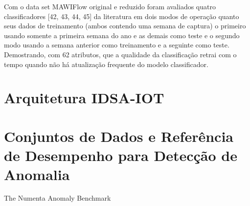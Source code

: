 Com o data set MAWIFlow original e reduzido foram avaliados quatro classificadores [42, 43, 44, 45]
da literatura em dois modos de operação quanto seus dados de treinamento
(ambos contendo uma semana de captura) o primeiro usando somente a primeira semana do ano e as demais
como teste e o segundo modo usando a semana anterior como treinamento e a seguinte como teste.
Demostrando, com 62 atributos, que a qualidade da classificação retrai com o tempo quando não há
atualização frequente do modelo classificador.


\section{Arquitetura IDSA-IOT}

\section{Conjuntos de Dados e Referência de Desempenho para Detecção de Anomalia}

The Numenta Anomaly Benchmark



